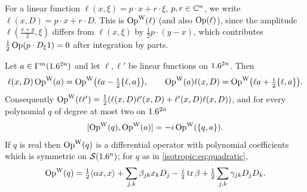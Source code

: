 For a linear function $\ell(x,\xi)=p\cdot x+r\cdot\xi$, $p,r\in\mathbb{C}^n$, we write
$\ell(x,D)=p\cdot x+r\cdot D$. This is $\operatorname{Op}^{\mathrm{W}}(\ell)$ (and also $\operatorname{Op}(\ell)$), since
the amplitude $\ell(\frac{x+y}2,\xi)$ differs from $\ell(x,\xi)$ by
$\frac12p\cdot(y-x)$, which contributes $\frac12\operatorname{Op}(p\cdot D_\xi1)=0$ after
integration by parts.

\begin{lemma}\label{isotropic:lem:weyl-quadratic}
Let $a\in\Gamma^{m}(1.6^{2n})$ and let $\ell,\ell'$ be linear functions on $1.6^{2n}$.
Then
\begin{equation}\label{isotropic:eq:weyl-linear}
  \ell(x,D)\operatorname{Op}^{\mathrm{W}}(a)=\operatorname{Op}^{\mathrm{W}}\bigl(\ell a-\tfrac i2\{\ell,a\}\bigr),\qquad
  \operatorname{Op}^{\mathrm{W}}(a)\ell(x,D)=\operatorname{Op}^{\mathrm{W}}\bigl(\ell a+\tfrac i2\{\ell,a\}\bigr).
\end{equation}
Consequently $\operatorname{Op}^{\mathrm{W}}(\ell\ell')=\frac12(\ell(x,D)\ell'(x,D)+\ell'(x,D)\ell(x,D))$,
and for every polynomial $q$ of degree at most two on $1.6^{2n}$
\begin{equation}\label{isotropic:eq:exact-commutator}
  [\operatorname{Op}^{\mathrm{W}}(q),\operatorname{Op}^{\mathrm{W}}(a)]=-i\operatorname{Op}^{\mathrm{W}}(\{q,a\}).
\end{equation}
If $q$ is real then $\operatorname{Op}^{\mathrm{W}}(q)$ is a differential operator with polynomial
coefficients which is symmetric on $\mathcal{S}(1.6^n)$; for $q$ as in
\eqref{isotropic:eq:quadratic},
\begin{equation}\label{isotropic:eq:weyl-quadratic}
  \operatorname{Op}^{\mathrm{W}}(q)=\tfrac12\langle \alpha x, x\rangle+\sum_{j,k}\beta_{jk}x_kD_j-\tfrac i2\operatorname{tr}\beta+\tfrac12\sum_{j,k}\gamma_{jk}D_jD_k .
\end{equation}
\end{lemma}
